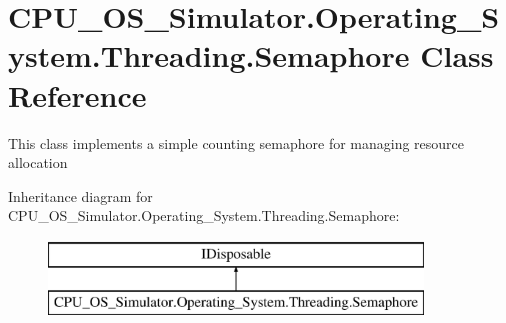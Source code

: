 \hypertarget{class_c_p_u___o_s___simulator_1_1_operating___system_1_1_threading_1_1_semaphore}{}\section{C\+P\+U\+\_\+\+O\+S\+\_\+\+Simulator.\+Operating\+\_\+\+System.\+Threading.\+Semaphore Class Reference}
\label{class_c_p_u___o_s___simulator_1_1_operating___system_1_1_threading_1_1_semaphore}


This class implements a simple counting semaphore for managing resource allocation  


Inheritance diagram for C\+P\+U\+\_\+\+O\+S\+\_\+\+Simulator.\+Operating\+\_\+\+System.\+Threading.\+Semaphore\+:\begin{figure}[H]
\begin{center}
\leavevmode
\includegraphics[height=2.000000cm]{class_c_p_u___o_s___simulator_1_1_operating___system_1_1_threading_1_1_semaphore}
\end{center}
\end{figure}
